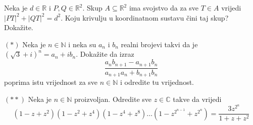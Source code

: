 \begin{exercise}
\begin{exercise}
Neka je $d\in \mathbb{R}$ i $P, Q\in \mathbb{R}^2$. Skup $A\subseteq \mathbb{R}^2$ ima svojstvo da za sve $T\in A$ vrijedi $|PT|^2+|QT|^2=d^2$. Koju krivulju u koordinatnom sustavu čini taj skup? Dokažite.
\end{exercise}
\begin{exercise} $(*)$
Neka je $n\in \mathbb{N}$ i neka su $a_n$ i $b_n$ realni brojevi takvi da je $(\sqrt{3}+i)^n=a_n+ib_n$. Dokažite da izraz
$$\dfrac{a_nb_{n+1}-a_{n+1}b_n}{a_{n+1}a_n+b_{n+1}b_n}$$
poprima istu vrijednost za sve $n\in \mathbb{N}$ i odredite tu vrijednost.
\end{exercise}
\begin{exercise} $(**)$
Neka je $n\in \mathbb{N}$ proizvoljan. Odredite sve $z\in \mathbb{C}$ takve da vrijedi
$$\left(1-z+z^2\right)\left(1-z^2+z^4\right)\left(1-z^4+z^8\right)\dots\left(1-z^{2^{n-1}}+z^{2^n}\right)=\dfrac{3z^{2^n}}{1+z+z^2}$$
\end{exercise}
\end{exercise}